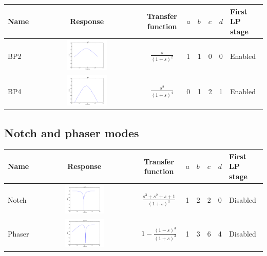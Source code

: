 \documentclass[a4paper,10pt]{article}
\begin{document}
\begin{tabular}{lcclllll}
\hline
Name & Response & Transfer function & $a$ & $b$ & $c$ & $d$ & First LP stage \\
\hline
BP2 & \includegraphics[width=0.4\textwidth]{response_bp2.pdf} & $\frac{s}{(1 + s)^2}$ & 1 & 1 & 0 & 0 & Enabled \\
\hline
BP4 & \includegraphics[width=0.4\textwidth]{response_bp4.pdf} & $\frac{s^2}{(1 + s)^4}$ & 0 & 1 & 2 & 1 & Enabled \\
\hline
\end{tabular}

\subsection{Notch and phaser modes}

\begin{tabular}{lcclllll}
\hline
Name & Response & Transfer function & $a$ & $b$ & $c$ & $d$ & First LP stage \\
\hline
Notch & \includegraphics[width=0.4\textwidth]{response_notch.pdf} & $\frac{s^3 + s^2 + s + 1}{(1 + s)^3}$ & 1 & 2 & 2 & 0 & Disabled \\
\hline
Phaser & \includegraphics[width=0.4\textwidth]{response_phaser.pdf} & $1 - \frac{(1 - s)^3}{(1 + s)^3}$ & 1 & 3 & 6 & 4 & Disabled \\
\hline
\end{tabular}
\end{document}
